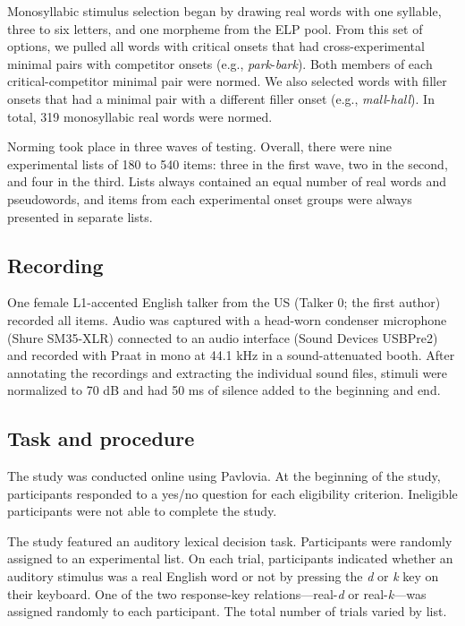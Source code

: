 \documentclass[preprint, 3p, authoryear]{elsarticle} %
\begin{document}
Monosyllabic stimulus selection began by drawing real words with one syllable, three to six letters, and one morpheme from the ELP pool.
From this set of options, we pulled all words with critical onsets that had cross-experimental minimal pairs with competitor onsets (e.g., \emph{park}-\emph{bark}).
Both members of each critical-competitor minimal pair were normed.
We also selected words with filler onsets that had a minimal pair with a different filler onset (e.g., \emph{mall}-\emph{hall}).
In total, 319 monosyllabic real words were normed.

Norming took place in three waves of testing.
Overall, there were nine experimental lists of 180 to 540 items: three in the first wave, two in the second, and four in the third.
Lists always contained an equal number of real words and pseudowords, and items from each experimental onset groups were always presented in separate lists.

\hypertarget{methods-rec}{%
\subsection{Recording}\label{methods-rec}}

One female L1-accented English talker from the US (Talker 0; the first author) recorded all items.
Audio was captured with a head-worn condenser microphone (Shure SM35-XLR) connected to an audio interface (Sound Devices USBPre2) and recorded with Praat \citep{broersma2021} in mono at 44.1 kHz in a sound-attenuated booth.
After annotating the recordings and extracting the individual sound files, stimuli were normalized to 70 dB and had 50 ms of silence added to the beginning and end.

\hypertarget{task-and-procedure}{%
\subsection{Task and procedure}\label{task-and-procedure}}

The study was conducted online using Pavlovia.
At the beginning of the study, participants responded to a yes/no question for each eligibility criterion.
Ineligible participants were not able to complete the study.

The study featured an auditory lexical decision task.
Participants were randomly assigned to an experimental list.
On each trial, participants indicated whether an auditory stimulus was a real English word or not by pressing the \emph{d} or \emph{k} key on their keyboard.
One of the two response-key relations---real-\emph{d} or real-\emph{k}---was assigned randomly to each participant.
The total number of trials varied by list.
\end{document}
